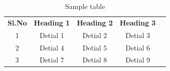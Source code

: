 \documentclass[twoside,a4paper,openright]{report} %
\begin{document}
% 
% 
% 

\begin{table}[h]
	\begin{center}
		
		
		\begin{tabular}{|c|c|c|c|l}
			\cline{1-4}
			\textbf{Sl.No} & \textbf{Heading 1} & \textbf{Heading 2} & \textbf{Heading 3} &  \\ \cline{1-4}
			1              & Detial 1           & Detial 2           & Detial 3           &  \\ \cline{1-4}
			2              & Detial 4           & Detial 5           & Detial 6           &  \\ \cline{1-4}
			3              & Detial 7           & Detial 8           & Detial 9           &  \\ \cline{1-4}
		\end{tabular}
		\caption{Sample table}
		\label{tab:table1}
	\end{center}
\end{table}
\fi

\pagestyle{plain} %
\pagestyle{fancy} %
\end{document}

